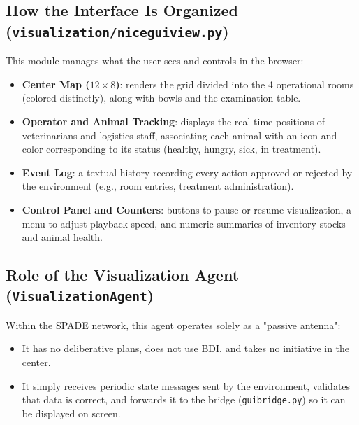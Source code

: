 \documentclass{article}
\renewcommand{\_}{\oldtextunderscore\allowbreak}
\begin{document}
\subsection{How the Interface Is Organized (\texttt{visualization/\allowbreak nicegui\_view.py})}
This module manages what the user sees and controls in the browser:
\begin{itemize}
    \item \textbf{Center Map ($12 \times 8$)}: renders the grid divided into the 4 operational rooms (colored distinctly), along with bowls and the examination table.
    \item \textbf{Operator and Animal Tracking}: displays the real-time positions of veterinarians and logistics staff, associating each animal with an icon and color corresponding to its status (healthy, hungry, sick, in treatment).
    \item \textbf{Event Log}: a textual history recording every action approved or rejected by the environment (e.g., room entries, treatment administration).
    \item \textbf{Control Panel and Counters}: buttons to pause or resume visualization, a menu to adjust playback speed, and numeric summaries of inventory stocks and animal health.
\end{itemize}

\subsection{Role of the Visualization Agent (\texttt{VisualizationAgent})}
Within the SPADE network, this agent operates solely as a "passive antenna":
\begin{itemize}
    \item It has no deliberative plans, does not use BDI, and takes no initiative in the center.
    \item It simply receives periodic state messages sent by the environment, validates that data is correct, and forwards it to the bridge (\texttt{gui\_bridge.py}) so it can be displayed on screen.
\end{itemize}
\end{document}
